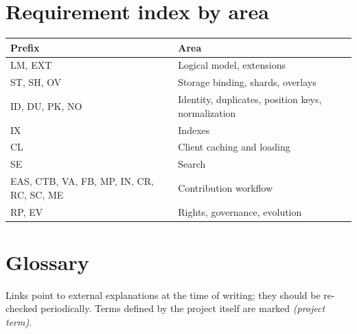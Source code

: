 \documentclass[11pt,a4paper]{article}
\begin{document}
\section{Requirement index by area}
\begin{longtable}{@{}p{3.6cm}p{10.7cm}@{}}
\toprule
\textbf{Prefix} & \textbf{Area}\\
\midrule
\endhead
LM, EXT & Logical model, extensions\\
ST, SH, OV & Storage binding, shards, overlays\\
ID, DU, PK, NO & Identity, duplicates, position keys, normalization\\
IX & Indexes\\
CL & Client caching and loading\\
SE & Search\\
EAS, CTB, VA, FB, MP, IN, CR, RC, SC, ME & Contribution workflow\\
RP, EV & Rights, governance, evolution\\
\bottomrule
\end{longtable}

\clearpage
\section*{Glossary}
Links point to external explanations at the time of writing; they should be re-checked periodically. Terms defined by the project itself are marked \emph{(project term)}.
\end{document}
